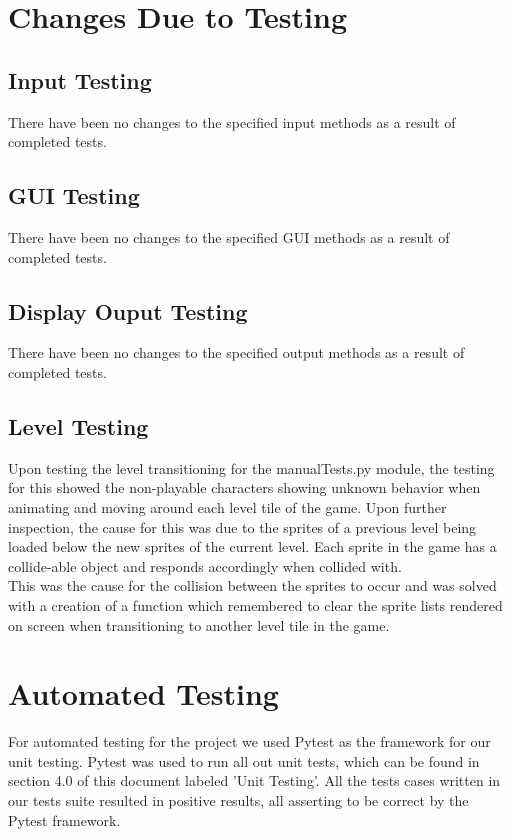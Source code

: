 \documentclass[12pt, titlepage]{article}
\begin{document}
\section{Changes Due to Testing}
\subsection{Input Testing}
There have been no changes to the specified input methods as a result of completed tests.

\subsection{GUI Testing}
There have been no changes to the specified  GUI methods as a result of completed tests.

\subsection{Display Ouput Testing}
There have been no changes to the specified output methods as a result of completed tests.

\subsection{Level Testing}
Upon testing the level transitioning for the manualTests.py module, the testing for this showed the non-playable characters
showing unknown behavior when animating and moving around each level tile of the game. Upon further inspection,
the cause for this was due to the sprites of a previous level being loaded below the new sprites of the current level. Each sprite
in the game has a collide-able object and responds accordingly when collided with. \\

This was the cause for the collision between the sprites to occur and was solved with a creation of a function which remembered to clear the sprite lists rendered on screen when transitioning to another level tile in the game.

\section{Automated Testing}
For automated testing for the project we used Pytest as the framework for our unit testing.
Pytest was used to run all out unit tests, which can be found in section 4.0 of this document labeled 'Unit Testing'. All the tests cases
written in our tests suite resulted in positive results, all asserting to be correct by the Pytest framework. 
		
\end{document}
